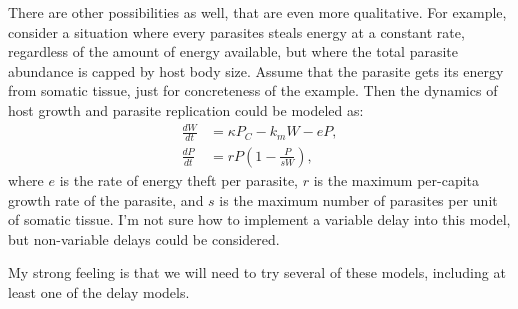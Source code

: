 \documentclass[12pt,reqno,final,pdftex]{amsart}\usepackage[]{graphicx}\usepackage[]{color}
\theoremstyle{plain}
\numberwithin{equation}{part}
\begin{document}
There are other possibilities as well, that are even more qualitative.
For example, consider a situation where every parasites steals energy at a constant rate, regardless of the amount of energy available, but where the total parasite abundance is capped by host body size.
Assume that the parasite gets its energy from somatic tissue, just for concreteness of the example.
Then the dynamics of host growth and parasite replication could be modeled as:
\begin{align}
\frac{dW}{dt} &= \kappa P_C - k_m W - e P, \\
\frac{dP}{dt} &= r P \left(1 - \frac{P}{s W}\right),
\end{align}
where $e$ is the rate of energy theft per parasite, $r$ is the maximum per-capita growth rate of the parasite, and $s$ is the maximum number of parasites per unit of somatic tissue.
I'm not sure how to implement a variable delay into this model, but non-variable delays could be considered.

My strong feeling is that we will need to try several of these models, including at least one of the delay models.
\end{document}
